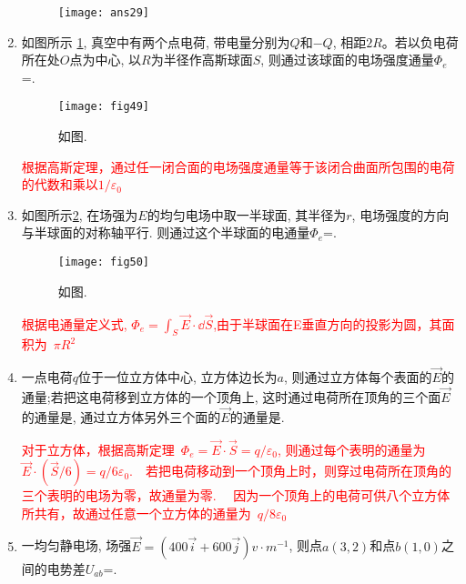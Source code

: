 \begin{enumerate}
\begin{note}
\begin{figure}[H]
            \begin{minipage}[H]{0.3\linewidth}
                \texttt{[image: ans29]}
            \end{minipage}
        \end{figure}
    \end{note}
    \item   如图所示 \ref{Fig:49}, 真空中有两个点电荷, 带电量分别为$Q$和$-Q$, 相距$2R$。若以负电荷
    所在处$O$点为中心, 以$R$为半径作高斯球面$S$, 则通过该球面的电场强度通量$\varPhi_e$=. 
    \begin{figure}[H]
        \centering
        \texttt{[image: fig49]}
        \caption{如图.}\label{Fig:49}
    \end{figure}
    \begin{note}
        \textcolor{red}{根据高斯定理，通过任一闭合面的电场强度通量等于该闭合曲面所包围的电荷的代数和乘以$1/\varepsilon_0$
        }
    \end{note}
    \item 如图所示\ref{Fig:50}, 在场强为$E$的均匀电场中取一半球面, 其半径为$r$, 电场强度的方向与半球面的对称轴平行. 则通过这个半球面的电通量$\varPhi_e$=.
    \begin{figure}[H]
        \centering
        \texttt{[image: fig50]}
        \caption{如图.}\label{Fig:50}
    \end{figure}
    \begin{note}
        \textcolor{red}{根据电通量定义式, $\varPhi_e=\int_S \vec{E}\cdot \dd \vec{S}$,由于半球面在E垂直方向的投影为圆，其面积为~$\pi R^2$
        }
    \end{note}
    \item 一点电荷$q$位于一位立方体中心, 立方体边长为$a$, 则通过立方体每个表面的$\vec{E}$的通量;若把这电荷移到立方体的一个顶角上, 这时通过电荷所在顶角的三个面$\vec{E}$的通量是, 通过立方体另外三个面的$\vec{E}$的通量是.
    \begin{note}
        \textcolor{red}{对于立方体，根据高斯定理~$\varPhi_e=\vec{E}\cdot\vec{S}=q/\varepsilon_0$, 则通过每个表明的通量为~$\vec{E}\cdot (\vec{S}/6)=q/6\varepsilon_0$.}\ \ 
        \textcolor{red}{若把电荷移动到一个顶角上时，则穿过电荷所在顶角的三个表明的电场为零，故通量为零.
        }\ \ 
        \textcolor{red}{因为一个顶角上的电荷可供八个立方体所共有，故通过任意一个立方体的通量为~$q/8\varepsilon_0$}
    \end{note}
    \item 一均匀静电场, 场强$\vec{E}=(400\vec{i}+600\vec{j})v\cdot m^{-1}$, 则点$a(3, 2)$和点$b(1, 0)$之间的电势差$U_{ab}$=.

\end{enumerate}
